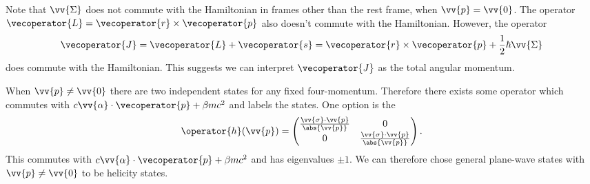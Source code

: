 \documentclass[fleqn]{NotesClass}
\begin{document}
\begin{appendices}
        Note that \(\vv{\Sigma}\) does not commute with the Hamiltonian in frames other than the rest frame, when \(\vv{p} = \vv{0}\).
        The operator \(\vecoperator{L} = \vecoperator{r} \times \vecoperator{p}\) also doesn't commute with the Hamiltonian.
        However, the operator
        \begin{equation}
            \vecoperator{J} = \vecoperator{L} + \vecoperator{s} = \vecoperator{r} \times \vecoperator{p} + \frac{1}{2}\hbar\vv{\Sigma}
        \end{equation}
        does commute with the Hamiltonian.
        This suggests we can interpret \(\vecoperator{J}\) as the total angular momentum.
        
        When \(\vv{p} \ne \vv{0}\) there are two independent states for any fixed four-momentum.
        Therefore there exists some operator which commutes with \(c\vv{\alpha} \cdot \vecoperator{p} + \beta mc^2\) and labels the states.
        One option is the 
        \begin{equation}
            \operator{h}(\vv{p}) = 
            \begin{pmatrix}
                \frac{\vv{\sigma} \cdot \vv{p}}{\abs{\vv{p}}} & 0\\
                0 & \frac{\vv{\sigma}\cdot\vv{p}}{\abs{\vv{p}}}
            \end{pmatrix}
            .
        \end{equation}
        This commutes with \(c\vv{\alpha} \cdot\vecoperator{p} + \beta mc^2\) and has eigenvalues \(\pm 1\).
        We can therefore chose general plane-wave states with \(\vv{p} \ne \vv{0}\) to be helicity states.
        
    \end{appendices}
    
    \backmatter
    \printindex
\end{document}
